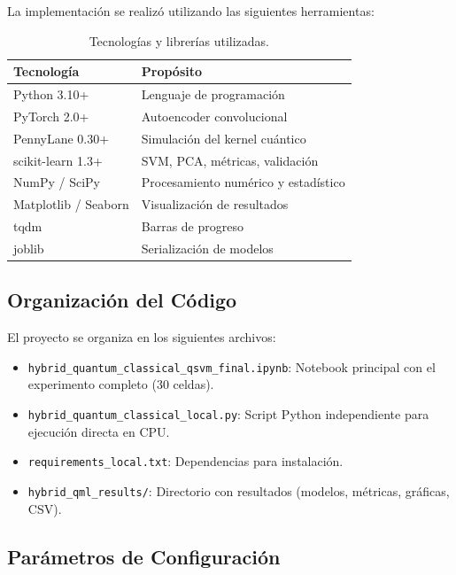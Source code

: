 \documentclass[conference]{IEEEtran}
\begin{document}
La implementación se realizó utilizando las siguientes herramientas:

\begin{table}[H]
    \centering
    \caption{Tecnologías y librerías utilizadas.}
    \label{tab:software}
    \begin{tabular}{ll}
        \toprule
        \textbf{Tecnología} & \textbf{Propósito} \\
        \midrule
        Python 3.10+ & Lenguaje de programación \\
        PyTorch 2.0+ & Autoencoder convolucional \\
        PennyLane 0.30+ & Simulación del kernel cuántico \\
        scikit-learn 1.3+ & SVM, PCA, métricas, validación \\
        NumPy / SciPy & Procesamiento numérico y estadístico \\
        Matplotlib / Seaborn & Visualización de resultados \\
        tqdm & Barras de progreso \\
        joblib & Serialización de modelos \\
        \bottomrule
    \end{tabular}
\end{table}

\subsection{Organización del Código}

El proyecto se organiza en los siguientes archivos:

\begin{itemize}
    \item \texttt{hybrid\_quantum\_classical\_qsvm\_final.ipynb}: Notebook 
          principal con el experimento completo (30 celdas).
    \item \texttt{hybrid\_quantum\_classical\_local.py}: Script Python 
          independiente para ejecución directa en CPU.
    \item \texttt{requirements\_local.txt}: Dependencias para instalación.
    \item \texttt{hybrid\_qml\_results/}: Directorio con resultados (modelos, 
          métricas, gráficas, CSV).
\end{itemize}

\subsection{Parámetros de Configuración}
\end{document}
